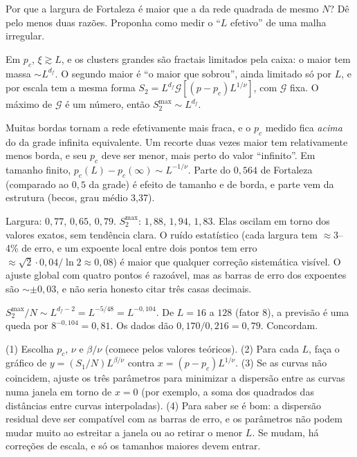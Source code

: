 \documentclass[11pt]{article}
\begin{document}
 Por que a largura de Fortaleza é maior que a da rede quadrada de mesmo $N$? Dê pelo menos duas razões. Proponha como medir o ``$L$ efetivo'' de uma malha irregular.

\solucoes

Em $p_c$, $\xi\gtrsim L$, e os clusters grandes são fractais limitados pela caixa: o maior tem massa $\sim L^{d_f}$. O segundo maior é ``o maior que sobrou'', ainda limitado só por $L$, e por escala tem a mesma forma $S_2 = L^{d_f}\mathcal G[(p-p_c)L^{1/\nu}]$, com $\mathcal G$ fixa. O máximo de $\mathcal G$ é um número, então $S_2^{\max}\sim L^{d_f}$.

Muitas bordas tornam a rede efetivamente mais fraca, e o $p_c$ medido fica \emph{acima} do da grade infinita equivalente. Um recorte duas vezes maior tem relativamente menos borda, e seu $p_c$ deve ser menor, mais perto do valor ``infinito''. Em tamanho finito, $p_c(L)-p_c(\infty)\sim L^{-1/\nu}$. Parte do $0{,}564$ de Fortaleza (comparado ao $0{,}5$ da grade) é efeito de tamanho e de borda, e parte vem da estrutura (becos, grau médio 3,37).

Largura: $0{,}77$, $0{,}65$, $0{,}79$. $S_2^{\max}$: $1{,}88$, $1{,}94$, $1{,}83$. Elas oscilam em torno dos valores exatos, sem tendência clara. O ruído estatístico (cada largura tem $\approx3$--4\% de erro, e um expoente local entre dois pontos tem erro $\approx\sqrt2\cdot0{,}04/\ln2\approx0{,}08$) é maior que qualquer correção sistemática visível. O ajuste global com quatro pontos é razoável, mas as barras de erro dos expoentes são $\sim\pm0{,}03$, e não seria honesto citar três casas decimais.

$S_2^{\max}/N\sim L^{d_f-2} = L^{-5/48} = L^{-0{,}104}$. De $L=16$ a $128$ (fator 8), a previsão é uma queda por $8^{-0{,}104} = 0{,}81$. Os dados dão $0{,}170/0{,}216 = 0{,}79$. Concordam.

(1) Escolha $p_c$, $\nu$ e $\beta/\nu$ (comece pelos valores teóricos). (2) Para cada $L$, faça o gráfico de $y = (S_1/N)L^{\beta/\nu}$ contra $x = (p-p_c)L^{1/\nu}$. (3) Se as curvas não coincidem, ajuste os três parâmetros para minimizar a dispersão entre as curvas numa janela em torno de $x=0$ (por exemplo, a soma dos quadrados das distâncias entre curvas interpoladas). (4) Para saber se é bom: a dispersão residual deve ser compatível com as barras de erro, e os parâmetros não podem mudar muito ao estreitar a janela ou ao retirar o menor $L$. Se mudam, há correções de escala, e só os tamanhos maiores devem entrar.
\end{document}
